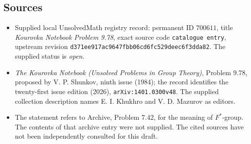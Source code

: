 \documentclass[11pt]{article}
\begin{document}
\subsection{Sources}
\begin{itemize}
\item Supplied local UnsolvedMath registry record: permanent ID \(700611\), title \emph{Kourovka Notebook Problem 9.78}, exact source code \texttt{catalogue entry}, upstream revision \texttt{d371ee917ac9647fbb06cd6fc529deec6f3dda82}. The supplied status is \emph{open}.
\item \emph{The Kourovka Notebook (Unsolved Problems in Group Theory)}, Problem 9.78, proposed by V. P. Shunkov, ninth issue (1984); the record identifies the twenty-first issue edition (2026), \texttt{arXiv:1401.0300v48}. The supplied collection description names E. I. Khukhro and V. D. Mazurov as editors.
\item The statement refers to Archive, Problem 7.42, for the meaning of \(F^{*}\)-group. The contents of that archive entry were not supplied. The cited sources have not been independently consulted for this draft.
\end{itemize}
\end{document}
